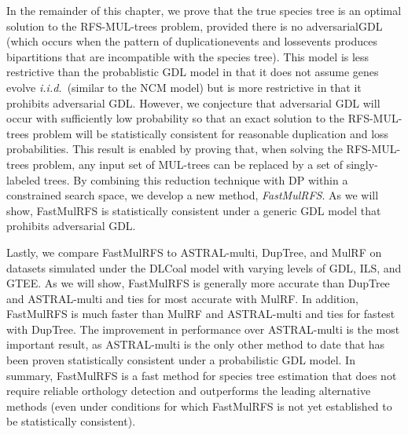 In the remainder of this chapter, we prove that the true species tree is an optimal solution to the RFS-MUL-trees problem, provided there is no \gls{adversarialGDL} (which occurs when the pattern of \glspl{duplicationevent} and \glspl{lossevent} produces \glspl{bipartition} that are incompatible with the species tree).
This model is less restrictive than the probablistic GDL model in that it does not assume genes evolve {\em i.i.d.}~(similar to the \gls{NCM} model) but is more restrictive in that it prohibits adversarial GDL.
However, we conjecture that adversarial GDL will occur with sufficiently low probability so that an exact solution to the RFS-MUL-trees problem will be statistically consistent for reasonable duplication and loss probabilities.
This result is enabled by proving that, when solving the RFS-MUL-trees problem, any input set of MUL-trees can be replaced by a set of \gls{singly-labeled} trees.
By combining this reduction technique with DP within a constrained search space, we develop a new method, \textit{\gls{FastMulRFS}}.
As we will show, FastMulRFS is statistically consistent under a generic GDL model that prohibits adversarial GDL.

Lastly, we compare FastMulRFS to ASTRAL-multi, DupTree, and MulRF on datasets simulated under the \gls{DLCoal} model with varying levels of GDL, ILS, and GTEE. 
As we will show, FastMulRFS is generally more accurate than  DupTree and ASTRAL-multi and ties for most accurate with MulRF.
In addition, FastMulRFS is much faster than MulRF and ASTRAL-multi and ties for fastest with DupTree.
The improvement in performance over ASTRAL-multi is the most important result, as ASTRAL-multi is the only other method to date that has been proven statistically consistent under a probabilistic GDL model.
In summary, FastMulRFS is a fast method for species tree estimation that does not require reliable orthology detection and outperforms the leading alternative methods (even under conditions for which FastMulRFS is not yet established to be statistically consistent).

